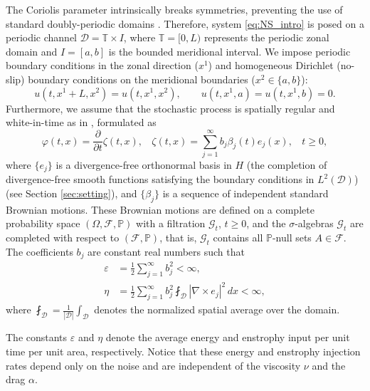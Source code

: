 \documentclass[11pt,a4paper]{article}
\numberwithin{equation}{section}
\numberwithin{theorem}{section}
\numberwithin{remark}{section}
\numberwithin{definition}{section}
\begin{document}
The Coriolis parameter intrinsically breaks symmetries, preventing the use of standard doubly-periodic domains \cite{YuriAmiraliGigliola,yuriamiraligigliolaWP, salmon}. Therefore, system \eqref{eq:NS_intro} is posed on a periodic channel $\mathcal{D} = \mathbb{T} \times I$, where $\mathbb{T}=[0, L)$ represents the periodic zonal domain and $I = [a,b]$ is the bounded meridional interval. We impose periodic boundary conditions in the zonal direction ($x^1$) and homogeneous Dirichlet (no-slip) boundary conditions on the meridional boundaries ($x^2 \in \{a,b\}$):
\begin{equation}\label{eq:boundary_conditions}
    u(t, x^1+L, x^2) = u(t, x^1, x^2), \qquad u(t, x^1, a) = u(t, x^1, b) = 0.
\end{equation}
Furthermore, we assume that the stochastic process is spatially regular and white-in-time as in \cite{bed2D, YuriAmiraliGigliola,yuriamiraligigliolaWP}, formulated as
\begin{equation}\label{eq:stochasticprocess}
    \varphi(t,x) = \frac{\partial}{\partial t}\zeta(t,x),\ \ \ \ \zeta(t,x) = \sum_{j=1}^{\infty} b_j \beta_j(t) e_j(x),\ \ \ \ t \geq 0,
\end{equation}
where $\{e_j\}$ is a divergence-free orthonormal basis in $H$ (the completion of divergence-free smooth functions satisfying the boundary conditions in $L^2(\mathcal{D})$) (see Section \ref{sec:setting}), and $\{\beta_j\}$ is a sequence of independent standard Brownian motions.
These Brownian motions are defined on a complete probability space $(\Omega,\mathcal{F},\mathbb{P})$ with a filtration $\mathcal{G}_t$, $t\geq0$, and the $\sigma$-algebras $\mathcal{G}_t$ are completed with respect to $(\mathcal{F},\mathbb{P})$, that is, $\mathcal{G}_t$ contains all $\mathbb{P}$-null sets $A\in \mathcal{F}$. 
The coefficients $b_j$ are constant real numbers such that
\begin{align} 
    \varepsilon &= \frac{1}{2}\sum_{j=1}^\infty b_j^2 < \infty, \label{eq:intro_energy}\\
    \eta &= \frac{1}{2}\sum_{j=1}^\infty b_j^2 \fint_{\mathcal{D}} |\nabla \times e_j|^2 \, dx < \infty,  \label{eq:intro_enstrophyavg}
\end{align}
where $\fint_\mathcal{D}  = \frac{1}{|\mathcal{D}|}\int_\mathcal{D} $ denotes the normalized spatial average over the domain.

The constants $\varepsilon$ and $\eta$ denote the average energy and enstrophy input per unit time per unit area, respectively. Notice that these energy and enstrophy injection rates depend only on the noise and are independent of the viscosity $\nu$ and the drag $\alpha$.
\end{document}
